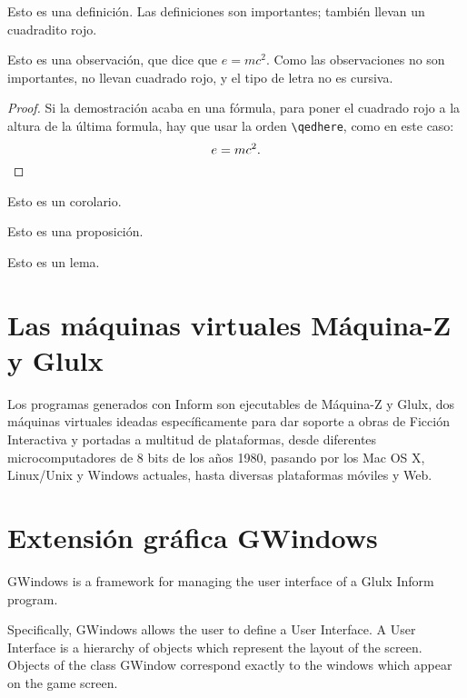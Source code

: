 \begin{definition}\label{def:1}
    Esto es una definición. Las definiciones son importantes; también llevan un cuadradito rojo.
\end{definition}

\begin{remark}
    Esto es una observación, que dice que $e=mc^{2}$. Como las observaciones no son importantes, no llevan cuadrado rojo, y el tipo de letra no es cursiva.
\end{remark}

\begin{proof}
    Si la demostración acaba en una fórmula, para poner el cuadrado rojo a la altura de la última formula, hay que usar la orden \verb|\qedhere|, como en este caso:
    \[
        e=mc^{2}.\qedhere
    \]
\end{proof}

\begin{corollary}\label{cor:1}
    Esto es un corolario.
\end{corollary}

\begin{proposition}\label{pro:1}
    Esto es una proposición.
\end{proposition}

\begin{lemma}[Gauss]\label{lem:1}
    Esto es un lema.
\end{lemma}


\section{Las máquinas virtuales Máquina-Z y Glulx}

Los programas generados con Inform son ejecutables de Máquina-Z y Glulx, dos máquinas virtuales ideadas específicamente para dar soporte a obras de Ficción Interactiva y portadas a multitud de plataformas, desde diferentes microcomputadores de 8 bits de los años 1980, pasando por los Mac OS X, Linux/Unix y Windows actuales, hasta diversas plataformas móviles y Web.


\section{Extensión gráfica GWindows}

GWindows is a framework for managing the user interface of a Glulx Inform program.

Specifically, GWindows allows the user to define a User Interface. A User Interface is a hierarchy of objects which represent the layout of the screen. Objects of the class GWindow correspond exactly to the windows which appear on the game screen.

